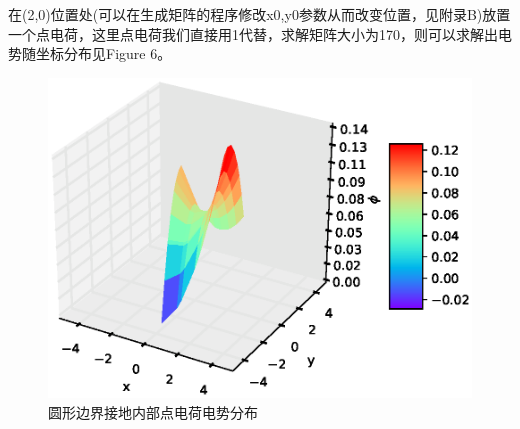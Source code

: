 \documentclass[twoside,twocolumn]{article}
\begin{document}
\begin{CJK*}{UTF8}{gkai}
	
	在(2,0)位置处(可以在生成矩阵的程序修改x0,y0参数从而改变位置，见附录B)放置一个点电荷，这里点电荷我们直接用1代替，求解矩阵大小为170，则可以求解出电势随坐标分布见Figure 6。
	\begin{figure}[h]
		\centering
		\includegraphics[width=1.0\linewidth]{figure/figureC}
		\caption{圆形边界接地内部点电荷电势分布}
		\label{fig:figureC}
	\end{figure}
	

\end{CJK*}
\end{document}
